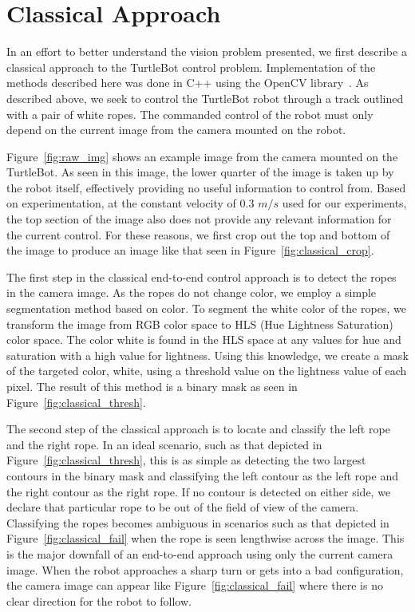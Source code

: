 \section{Classical Approach}
\label{sec:classical}

In an effort to better understand the vision problem presented, we first
describe a classical approach to the TurtleBot control problem. Implementation
of the methods described here was done in C++ using the OpenCV
library~\cite{opencv_library}. As described above, we seek to control the
TurtleBot robot through a track outlined with a pair of white ropes. The
commanded control of the robot must only depend on the current image from the
camera mounted on the robot.

Figure~\ref{fig:raw_img} shows an example image from the camera mounted on the
TurtleBot. As seen in this image, the lower quarter of the image is taken up by
the robot itself, effectively providing no useful information to control from.
Based on experimentation, at the constant velocity of 0.3 $m/s$ used for our
experiments, the top section of the image also does not provide any relevant
information for the current control. For these reasons, we first crop out the top
and bottom of the image to produce an image like that seen in 
Figure~\ref{fig:classical_crop}.

The first step in the classical end-to-end control approach is to detect the
ropes in the camera image. As the ropes do not change color, we employ a simple
segmentation method based on color. To segment the white color of the ropes, we
transform the image from RGB color space to HLS (Hue Lightness Saturation)
color space. The color white is found in the HLS space at any values for hue and
saturation with a high value for lightness. Using this knowledge, we create a
mask of the targeted color, white, using a threshold value on the lightness
value of each pixel. The result of this method is a binary mask as seen in
Figure~\ref{fig:classical_thresh}.

The second step of the classical approach is to locate and classify the left
rope and the right rope. In an ideal scenario, such as that depicted in
Figure~\ref{fig:classical_thresh}, this is as simple as detecting the two
largest contours in the binary mask and classifying the left contour as the left
rope and the right contour as the right rope. If no contour is detected on
either side, we declare that particular rope to be out of the field of view of
the camera. Classifying the ropes becomes
ambiguous in scenarios such as that depicted in Figure~\ref{fig:classical_fail}
when the rope is seen lengthwise across the image. This is the major downfall of
an end-to-end approach using only the current camera image. When the robot
approaches a sharp turn or gets into a bad configuration, the camera image can
appear like Figure~\ref{fig:classical_fail} where there is no clear direction
for the robot to follow.


